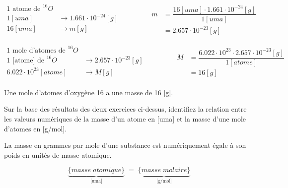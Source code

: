 \documentclass[
  11pt,
  a4paper,
  openany]{book}
\begin{document}
\begin{Answer}
\[ \begin{split}
    \text{1 atome de }^{16}O &\\
    1 [uma] &\longrightarrow 1.661\cdot10^{-24} [g]\\
    16 [uma] &\longrightarrow m [g]\\
    \end{split}
    \qquad\qquad
    \begin{split}
        m &= \dfrac{16 [uma] \cdot 1.661 \cdot 10^{-24} [g]}{1 [uma]}\\
        &= 2.657\cdot 10^{-23} [g]
    \end{split} \]

\[ \begin{split}
    \text{1 mole d'atomes de }^{16}O &\\
    \text{1 [atome] de } ^{16}O &\longrightarrow 2.657\cdot 10^{-23} [g]\\
    6.022\cdot 10^{23} [atome] &\longrightarrow M [g]\\
    \end{split}
    \qquad\qquad
    \begin{split}
    M &= \dfrac{6.022\cdot 10^{23} \cdot 2.657\cdot 10^{-23} [g]}{1 [atome]}\\
    &= 16 [g]
    \end{split} \]

Une mole d'atomes d'oxygène 16 a une masse de 16 {[}g{]}.

\end{Answer}

\clearpage

\begin{Exercise}

Sur la base des résultats des deux exercices ci-dessus, identifiez la relation entre les valeurs numériques de la masse d'un atome en {[}uma{]} et la masse d'une mole d'atomes en {[}g/mol{]}.


\end{Exercise}

\begin{Answer}
La masse en grammes par mole d'une substance est numériquement égale à son poids en unités de masse atomique.

\[ \underbrace{\{masse\;atomique\}}_\text{[uma]}\;=\;\underbrace{\{masse\;molaire\}}_\text{[g/mol]} \]

\end{Answer}
\end{document}

